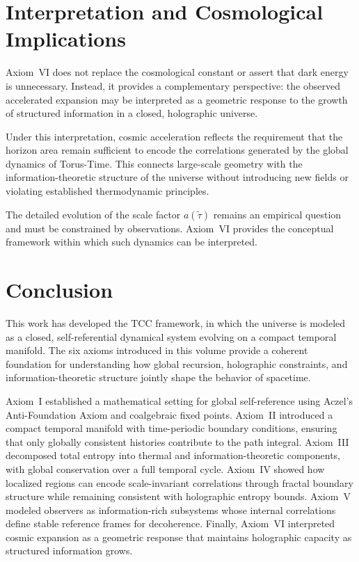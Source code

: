 \documentclass[12pt,openany]{book}
\theoremstyle{plain}
\theoremstyle{definition}
\theoremstyle{remark}
\begin{document}
\section{Interpretation and Cosmological Implications}

Axiom~VI does not replace the cosmological constant or assert that dark energy
is unnecessary. Instead, it provides a complementary perspective: the observed
accelerated expansion may be interpreted as a geometric response to the growth
of structured information in a closed, holographic universe.

Under this interpretation, cosmic acceleration reflects the requirement that
the horizon area remain sufficient to encode the correlations generated by the
global dynamics of Torus-Time. This connects large-scale geometry with the
information-theoretic structure of the universe without introducing new fields
or violating established thermodynamic principles.

The detailed evolution of the scale factor $a(\tilde{\tau})$ remains an
empirical question and must be constrained by observations. Axiom~VI provides
the conceptual framework within which such dynamics can be interpreted.

\section{Conclusion}

This work has developed the TCC framework, in which the universe is modeled as a closed, self-referential dynamical system
evolving on a compact temporal manifold. The six axioms introduced in this
volume provide a coherent foundation for understanding how global recursion,
holographic constraints, and information-theoretic structure jointly shape the
behavior of spacetime.

Axiom~I established a mathematical setting for global self-reference using
Aczel’s Anti-Foundation Axiom and coalgebraic fixed points. Axiom~II introduced
a compact temporal manifold with time-periodic boundary conditions, ensuring
that only globally consistent histories contribute to the path integral.
Axiom~III decomposed total entropy into thermal and information-theoretic
components, with global conservation over a full temporal cycle. Axiom~IV
showed how localized regions can encode scale-invariant correlations through
fractal boundary structure while remaining consistent with holographic entropy
bounds. Axiom~V modeled observers as information-rich subsystems whose internal
correlations define stable reference frames for decoherence. Finally,
Axiom~VI interpreted cosmic expansion as a geometric response that maintains
holographic capacity as structured information grows.
\end{document}
